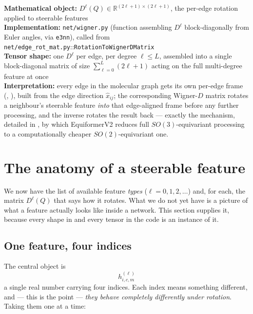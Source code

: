 \documentclass[11pt,a4paper]{report}
\theoremstyle{definition}
\theoremstyle{remark}
\newcommand{\RR}{\mathbb R}
\newcommand{\file}[1]{\texttt{#1}}
\newcommand{\pyfunc}[1]{\texttt{#1}}
\begin{document}
\begin{codebox}
\textbf{Mathematical object:} $D^\ell(Q)\in\RR^{(2\ell+1)\times(2\ell+1)}$, the
per-edge rotation applied to steerable features \\
\textbf{Implementation:} \file{net/wigner.py} (function assembling
$D^\ell$ block-diagonally from Euler angles, via \texttt{e3nn}), called from
\file{net/edge\_rot\_mat.py}::\pyfunc{RotationToWignerDMatrix} \\
\textbf{Tensor shape:} one $D^\ell$ per edge, per degree $\ell\le L$,
assembled into a single block-diagonal matrix of size
$\sum_{\ell=0}^L(2\ell+1)$ acting on the full multi-degree feature at once \\
\textbf{Interpretation:} every edge in the molecular graph gets its own
per-edge frame (, ), built
from the edge direction $\hat x_{ij}$; the corresponding Wigner-$D$ matrix
rotates a neighbour's steerable feature \emph{into} that edge-aligned
frame before any further processing, and the inverse rotates the result
back --- exactly the mechanism, detailed in , by
which EquiformerV2 reduces full $SO(3)$-equivariant processing to a
computationally cheaper $SO(2)$-equivariant one.
\end{codebox}

\section{The anatomy of a steerable feature}
\label{sec:feature-anatomy}

We now have the list of available feature \emph{types} ($\ell=0,1,2,\dots$)
and, for each, the matrix $D^\ell(Q)$ that says how it rotates. What we do
not yet have is a picture of what a feature actually looks like inside a
network. This section supplies it, because every shape in
 and every tensor in the code is an instance of it.

\subsection{One feature, four indices}

The central object is
\[
\boxed{\;h^{(\ell)}_{i,c,m}\;}
\]
a single real number carrying four indices. Each index means something
different, and --- this is the point --- \emph{they behave completely
differently under rotation}. Taking them one at a time:
\end{document}
